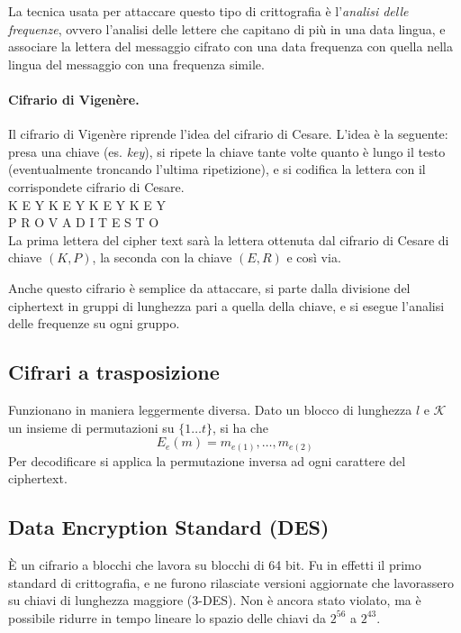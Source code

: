 \documentclass[a4paper, 10pt, twoside]{article}
\newcommand{\encr}{E_e}
\begin{document}
	La tecnica usata per attaccare questo tipo di crittografia è l'\textit{analisi delle frequenze}, ovvero l'analisi delle lettere che capitano di più in una data lingua, e associare la lettera del messaggio cifrato con una data frequenza con quella nella lingua del messaggio con una frequenza simile.
	
	\paragraph{Cifrario di Vigenère.}
	Il cifrario di Vigenère riprende l'idea del cifrario di Cesare. L'idea è la seguente: presa una chiave (es. \textit{key}), si ripete la chiave tante volte quanto è lungo il testo (eventualmente troncando l'ultima ripetizione), e si codifica la lettera con il corrispondete cifrario di Cesare. \\
	
	\noindent
	K E Y K E Y K E Y K E Y \\
	P R O V A D I T E S T O \\
	
	
	La prima lettera del cipher text sarà la lettera ottenuta dal cifrario di Cesare di chiave $(K,P)$, la seconda con la chiave $(E, R)$ e così via.
	
	Anche questo cifrario è semplice da attaccare, si parte dalla divisione del ciphertext in gruppi di lunghezza pari a quella della chiave, e si esegue l'analisi delle frequenze su ogni gruppo.
	
	\subsection{Cifrari a trasposizione}
	Funzionano in maniera leggermente diversa. Dato un blocco di lunghezza $l$ e $\mathcal{K}$ un insieme di permutazioni su $\lbrace 1 \dots t \rbrace$, si ha che \[ \encr(m) = m_{e(1)}, \dots, m_{e(2)} \] Per decodificare si applica la permutazione inversa ad ogni carattere del ciphertext.
	
	\subsection{Data Encryption Standard (DES)}
	È un cifrario a blocchi che lavora su blocchi di 64 bit. Fu in effetti il primo standard di crittografia, e ne furono rilasciate versioni aggiornate che lavorassero su chiavi di lunghezza maggiore (3-DES). Non è ancora stato violato, ma è possibile ridurre in tempo lineare lo spazio delle chiavi da $2^{56}$ a $2^{43}$.
	
\end{document}
